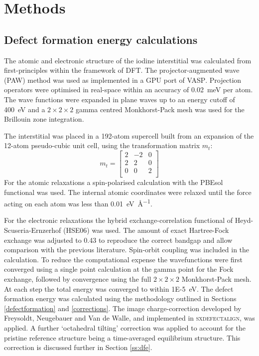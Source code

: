 \section{Methods}

\subsection{Defect formation energy calculations} \label{method:dfe}

The atomic and electronic structure of the iodine interstitial was calculated from first-principles within the framework of DFT. The projector-augmented wave (PAW) method\autocite{Blochl1994} was used as implemented in a GPU port of \textsc{VASP}.\autocite{Kresse1996a} Projection operators were optimised in real-space within an accuracy of \SI{0.02}{\milli\electronvolt} per atom. The wave functions were expanded in plane waves up to an energy cutoff of \SI{400}{\electronvolt} and a $2\! \times\!2\!\times\! 2$ gamma centred Monkhorst-Pack mesh was used for the Brillouin zone integration.

The interstitial was placed in a 192-atom supercell built from an expansion of the 12-atom pseudo-cubic unit cell, using the transformation matrix $m_t$:
$$
m_t = \begin{bmatrix}
2 & -2 & 0 \\
2 & 2 & 0 \\
0 & 0 & 2 \\
\end{bmatrix}
$$
For the atomic relaxations a spin-polarised calculation with the PBEsol functional was used.\autocite{Perdew2008a} The internal atomic coordinates were relaxed until the force acting on each atom was less than \SI{0.01}{\electronvolt\per\angstrom}. 

For the electronic relaxations the hybrid exchange-correlation functional of Heyd-Scuseria-Ernzerhof (HSE06) was used.\autocite{Heyd2004a,Heyd2005a} The amount of exact Hartree-Fock exchange was adjusted to 0.43 to reproduce the correct bandgap and allow comparison with the previous literature.\autocite{Meggiolaro2018,Du2015} 
 Spin-orbit coupling was included in the calculation.
To reduce the computational expense the wavefunctions were first converged using a single point calculation at the gamma point for the Fock exchange, followed by convergence using the full $2\!\times\!2\!\times\!2$ Monkhorst-Pack mesh. At each step the total energy was converged to within \SI{1E-5}{\electronvolt}.
The defect formation energy was calculated using the methodology outlined in Sections \ref{defectformation} and \ref{corrections}. The image charge-correction developed by Freysoldt, Neugebauer and Van de Walle, and implemented in \textsc{sxdefectalign},\autocite{sxdefectalign} was applied. A further `octahedral tilting' correction was applied to account for the pristine reference structure being a time-averaged equilibrium structure. This correction is discussed further in Section \ref{ss:dfe}.

